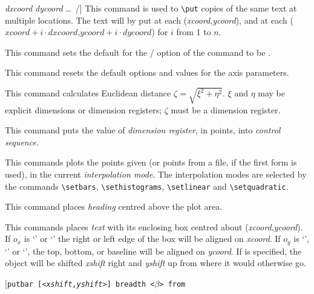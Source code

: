\begin{syntax}
{{\emph{dxcoord} \emph{dycoord} \ldots\ /}}]
This command is used to \verb+\put+ copies of the same text at multiple
locations. The text will by put at each (\emph{xcoord},\emph{ycoord}), and at
each ($xcoord+i\cdot dxcoord$,$ycoord+i\cdot dycoord$) for $i$ from 1 to $n$.
\item[\tt\bsl nogridlines]
This command sets the default for the /
option of the  command to be .
\item[\tt\bsl normalgraphs]
This command resets the default  options and values for the
axis parameters.
\item[\tt\bsl placehypotenuse for <$\xi$> and <$\eta$> in <$\zeta$>]
This command calculates Euclidean distance $\zeta=\sqrt{\xi^2+\eta^2}$. $\xi$
and $\eta$
may be explicit dimensions or dimension registers; $\zeta$ must be a
dimension register. 
\item[\tt\bsl placevalueinpts of <\emph{dimension register}> in
\{\emph{control sequence}\}]
This command puts the value of \emph{dimension register}, in points, into
\emph{control sequence}.
\item[{\tt\linestack[l]{\bsl plot "\emph{file name}"\\
\bsl plot \emph{xcoord}$_0$ \emph{ycoord}$_0$ \emph{xcoord}$_1$ \emph{ycoord}$_1$ \emph{xcoord}$_2$ \emph{ycoord}$_2$
\ldots\ /}}]
This commands plots the points given (or points from a file, if the first form
is used), in the current \emph{interpolation mode}. The interpolation modes
are selected by the commands \verb+\setbars+, \verb+\sethistograms+,
\verb+\setlinear+ and \verb+\setquadratic+.
\item[\tt\bsl plotheading \{\emph{heading}\}]
This command places \emph{heading} centred above the plot area.
\item[{\tt\bsl put \{\emph{text}\} 
{\rm[}[{\rm[}$o_x${\rm]}{\rm[}$o_y${\rm]}]{\rm]}
{\rm[}<\emph{xshift},\emph{yshift}>{\rm]} at \emph{xcoord} \emph{ycoord}}]
This commands places \emph{text} with its enclosing box centred about
(\emph{xcoord},\emph{ycoord}). If $o_x$ is `' or `' the right or left
edge of the box will be aligned on \emph{xcoord}. If $o_y$ is `',
`' or `', the top, bottom, or baseline  will be aligned on
\emph{ycoord}. If  is specified, the object will be
shifted \emph{xshift} right and \emph{yshift} up from where it would otherwise go.
\item[{\tt\bsl putbar {\rm[}<\emph{xshift},\emph{yshift}>{\rm]} breadth <$\beta$> from
}
\end{syntax}
